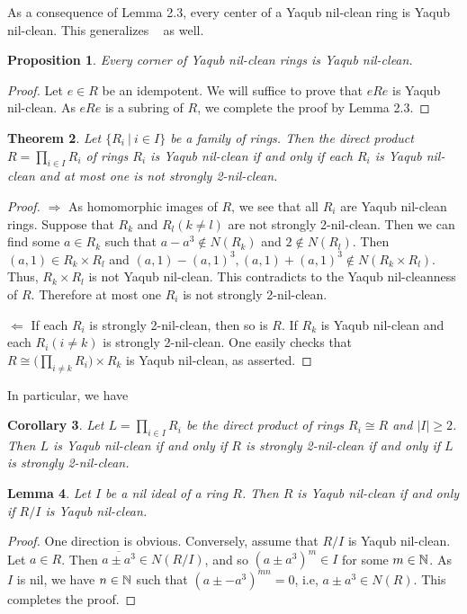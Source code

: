 \documentclass[12pt, reqno]{amsart}
\newtheorem{thm}{Theorem}[section]
\newtheorem{cor}[thm]{Corollary}
\newtheorem{lem}[thm]{Lemma}
\newtheorem{prop}[thm]{Proposition}
\numberwithin{equation}{section}
\begin{document}
As a consequence of Lemma 2.3, every center of a Yaqub nil-clean ring is Yaqub nil-clean. This generalizes ~\cite[Theorem 2]{ST} as well.

\begin{prop} Every corner of Yaqub nil-clean rings is Yaqub nil-clean.
\end{prop}
\begin{proof} Let $e\in R$ be an idempotent. We will suffice to prove that $eRe$ is Yaqub nil-clean. As $eRe$ is a subring of $R$, we complete the proof by
Lemma 2.3.\end{proof}

\begin{thm} Let
$\{R_{i}~|~i\in I\}$ be a family of rings. Then the direct product $R=\prod\limits_{i\in I}
R_{i}$ of rings $R_i$ is Yaqub nil-clean if and only if each
$R_{i}$ is Yaqub nil-clean and at most one is not strongly 2-nil-clean.\end{thm}
\begin{proof} $\Longrightarrow$ As homomorphic images of $R$, we see that all $R_i$ are Yaqub nil-clean rings. Suppose that
$R_{k}$ and $R_{l} (k\neq l)$ are not strongly 2-nil-clean. Then we can find some $a\in R_k$ such that $a-a^3\not\in N(R_k)$ and $2\not\in N(R_l)$.
Then $(a,1)\in R_k\times R_l$ and $(a,1)-(a,1)^3, (a,1)+(a,1)^3\not\in N(R_k\times R_l)$. Thus, $R_k\times R_l$ is not Yaqub nil-clean. This contradicts to the Yaqub nil-cleanness of $R$. Therefore at most one $R_i$ is not strongly 2-nil-clean.

$\Longleftarrow $ If each $R_i$ is strongly 2-nil-clean, then so is $R$. If $R_k$ is Yaqub nil-clean and each $R_i (i\neq k)$ is strongly 2-nil-clean. One easily checks that $R\cong \big(\prod\limits_{i\neq k}R_i\big)\times R_k$ is Yaqub nil-clean, as asserted.\end{proof}

In particular, we have

\begin{cor} Let
$L=\prod\limits_{i\in I}R_{i}$ be the direct product of rings
$R_i\cong R$ and $|I|\geq 2$. Then $L$ is Yaqub nil-clean if and
only if $R$ is strongly 2-nil-clean if and only if $L$ is strongly 2-nil-clean.\end{cor}

\begin{lem} Let $I$ be a nil ideal of a ring $R$. Then $R$ is Yaqub nil-clean if and only if $R/I$ is Yaqub nil-clean.\end{lem}\begin{proof} One direction is obvious. Conversely, assume that $R/I$ is Yaqub nil-clean. Let $a\in R$. Then $\overline{a\pm a^3}\in N(R/I)$, and so $(a\pm a^3)^{m}\in I$ for some $m\in {\Bbb N}$. As $I$ is nil, we have $n\in {\Bbb N}$ such that $(a\pm -a^3)^{mn}=0$, i.e, $a\pm a^3\in N(R)$. This completes the proof.\end{proof}
\end{document}
